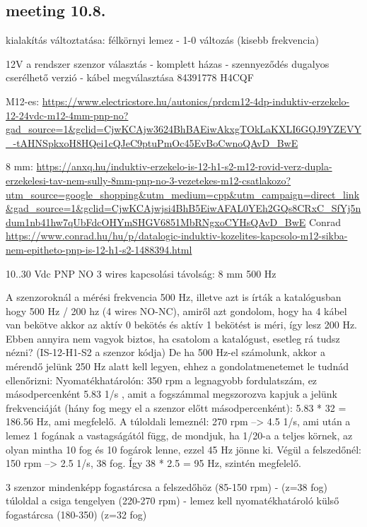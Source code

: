 \documentclass{article}
\begin{document}
	\subsection{meeting 10.8.}
	
	kialakítás változtatása: félkörnyi lemez - 1-0 változás (kisebb frekvencia)
	
	12V a rendszer
	szenzor választás - komplett házas - szennyeződés
	dugalyos cserélhető verzió - kábel megválasztása
	84391778 H4CQF
	
	M12-es: \url{https://www.electricstore.hu/autonics/prdcm12-4dp-induktiv-erzekelo-12-24vdc-m12-4mm-pnp-no?gad_source=1&gclid=CjwKCAjw3624BhBAEiwAkxgTOkLaKXLI6GQJ9YZEVY_-tAHNSpkxoH8HQei1cQJeC9ptuPmOc45EvBoCwnoQAvD_BwE}
	
	8 mm: \url{https://anxq.hu/induktiv-erzekelo-is-12-h1-s2-m12-rovid-verz-dupla-erzekelesi-tav-nem-sully-8mm-pnp-no-3-vezetekes-m12-csatlakozo?utm_source=google_shopping&utm_medium=cpp&utm_campaign=direct_link&gad_source=1&gclid=CjwKCAjwjsi4BhB5EiwAFAL0YEh2GQs8CRxC_SfYj5ndum1nb41hw7qUbFdcOHYmSHGV6851MbRNgxoCYHsQAvD_BwE}
	Conrad
	\url{https://www.conrad.hu/hu/p/datalogic-induktiv-kozelites-kapcsolo-m12-sikba-nem-epitheto-pnp-is-12-h1-s2-1488394.html}
	
	10..30 Vdc
	PNP NO
	3 wires
	kapcsolási távolság: 8 mm
	500 Hz
	
	A szenzoroknál a mérési frekvencia 500 Hz, illetve azt is írták a katalógusban hogy 500 Hz / 200 hz (4 wires NO-NC), amiről azt gondolom, hogy ha 4 kábel van bekötve akkor az aktív 0 bekötés és aktív 1 bekötést is méri, így lesz 200 Hz. Ebben annyira nem vagyok biztos, ha csatolom a katalógust, esetleg rá tudsz nézni? (IS-12-H1-S2 a szenzor kódja)
	De ha 500 Hz-el számolunk, akkor a mérendő jelünk 250 Hz alatt kell legyen, ehhez a gondolatmenetemet le tudnád ellenőrizni:
	Nyomatékhatárolón: 350 rpm a legnagyobb fordulatszám, ez másodpercenként 5.83 1/s , amit a fogszámmal megszorozva kapjuk a jelünk frekvenciáját (hány fog megy el a szenzor előtt másodpercenként): 5.83 * 32 = 186.56 Hz, ami megfelelő.
	A túloldali lemeznél: 270 rpm --> 4.5 1/s, ami után a lemez 1 fogának a vastagságától függ, de mondjuk, ha 1/20-a a teljes körnek, az olyan mintha 10 fog és 10 fogárok lenne, ezzel 45 Hz jönne ki.
	Végül a felszedőnél: 150 rpm --> 2.5 1/s, 38 fog. Így 38 * 2.5 = 95 Hz, szintén megfelelő.	
	
	
	3 szenzor mindenképp
	fogastárcsa a felszedőhöz (85-150 rpm) - (z=38 fog)
	túloldal a csiga tengelyen (220-270 rpm) - lemez kell
	nyomatékhatároló külső fogastárcsa (180-350) (z=32 fog)
	
\end{document}
